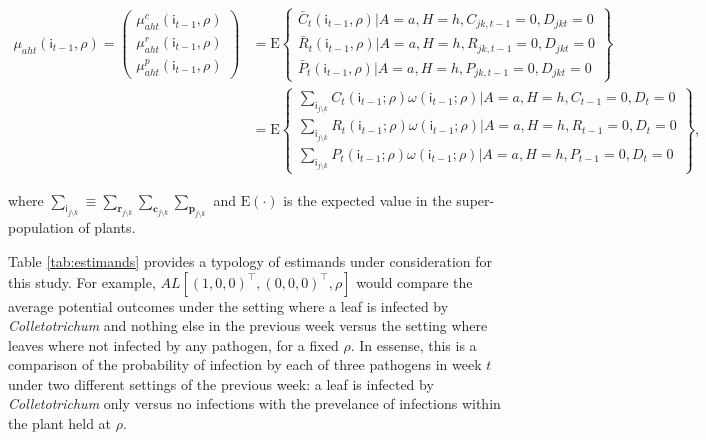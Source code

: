 \documentclass[]{article}
\begin{document}
\begin{align*}
\mu_{aht}(\mathsf{i}_{t-1}, \rho) = 
\begin{pmatrix}
  \mu^c_{aht}(\mathsf{i}_{t-1}, \rho) \\
  \mu^r_{aht}(\mathsf{i}_{t-1}, \rho) \\
  \mu^p_{aht}(\mathsf{i}_{t-1}, \rho) 
\end{pmatrix} &= 
\mathrm{E} 
\left\{ 
\begin{array}{l}
  \bar{C}_{t}(\mathsf{i}_{t-1}, \rho) | A = a, H = h, C_{jk,t-1} = 0, D_{jkt} = 0 \\
  \bar{R}_{t}(\mathsf{i}_{t-1}, \rho) | A = a, H = h, R_{jk,t-1} = 0, D_{jkt} = 0 \\ 
  \bar{P}_{t}(\mathsf{i}_{t-1}, \rho) | A = a, H = h, P_{jk,t-1} = 0, D_{jkt} = 0
\end{array}
\right\} \\
&= 
\mathrm{E} \left\{
\begin{array}{l}
  \sum_{\mathsf{i}_{j \setminus k}} C_{t}(\mathsf{i}_{t-1}; \rho) \omega(\mathsf{i}_{t-1}; \rho) | A = a, H = h, C_{t-1} = 0, D_t = 0 \\
  \sum_{\mathsf{i}_{j \setminus k}} R_{t}(\mathsf{i}_{t-1}; \rho) \omega(\mathsf{i}_{t-1}; \rho) | A = a, H = h, R_{t-1} = 0, D_t = 0 \\ 
  \sum_{\mathsf{i}_{j \setminus k}} P_{t}(\mathsf{i}_{t-1}; \rho) \omega(\mathsf{i}_{t-1}; \rho) | A = a, H = h, P_{t-1} = 0, D_t = 0
\end{array}
\right\}
,
\end{align*}

where
\(\sum_{\mathsf{i}_{j \setminus k}} \equiv \sum_{\mathbf{r}_{j \setminus k}} \sum_{\mathbf{c}_{j \setminus k}} \sum_{\mathbf{p}_{j \setminus k}}\)
and \(\mathrm{E}(\cdot)\) is the expected value in the super-population
of plants.

Table \ref{tab:estimands} provides a typology of estimands under
consideration for this study. For example,
\(AL[(1, 0, 0)^{\intercal}, (0, 0, 0)^{\intercal}, \rho]\) would compare
the average potential outcomes under the setting where a leaf is
infected by \emph{Colletotrichum} and nothing else in the previous week
versus the setting where leaves where not infected by any pathogen, for
a fixed \(\rho\). In essense, this is a comparison of the probability of
infection by each of three pathogens in week \(t\) under two different
settings of the previous week: a leaf is infected by
\emph{Colletotrichum} only versus no infections with the prevelance of
infections within the plant held at \(\rho\).
\end{document}
